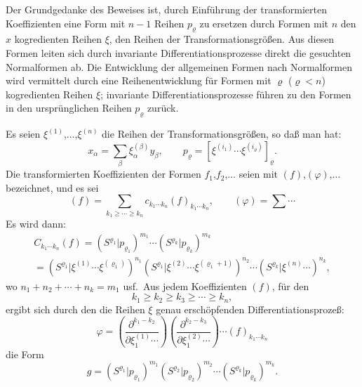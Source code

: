 \documentclass[12pt,a4paper]{article}
\begin{document}
Der Grundgedanke des Beweises ist, durch Einführung der transformierten Koeffizienten eine Form mit $n-1$ Reihen $p_{\varrho}$ zu ersetzen durch Formen mit $n$ den $x$ kogredienten Reihen $\xi$, den Reihen der Transformationsgrößen. Aus diesen Formen leiten sich durch invariante Differentiationsprozesse direkt die gesuchten Normalformen ab. Die Entwicklung der allgemeinen Formen nach Normalformen wird vermittelt durch eine Reihenentwicklung für Formen mit $\varrho$ ($\varrho < n$) kogredienten Reihen $\xi$; invariante Differentiationsprozesse führen zu den Formen in den ursprünglichen Reihen $p_{\varrho}$ zurück.

Es seien $\xi^{(1)}$,$\ldots$,$\xi^{(n)}$ die Reihen der Transformationsgrößen, so daß man hat:
\begin{equation}\tag{47}
x_{\alpha} = \sum_{\beta} \xi^{(\beta)}_{\alpha} y_{\beta}, \qquad p_{\varrho} = [\xi^{(i_{1})} \cdots \xi^{(i_{\varrho})}]_{\varrho}.
\end{equation}
Die transformierten Koeffizienten der Formen $f_{1}$,$f_{2}$,$\ldots$ seien mit $(f)$,$(\varphi)$,$\ldots$ bezeichnet, und es sei
\begin{equation}\tag{48}
(f) = \sum_{k_{1} \geq \cdots \geq k_{n}} c_{k_{1} \cdots k_{n}} (f)_{k_{1} \cdots k_{n}}, \qquad (\varphi) = \sum \cdots
\end{equation}
Es wird dann:
\begin{multline*}\tag{49}
C_{k_{1} \cdots k_{n}}(f) = (S^{\varrho_{1}} | p_{\varrho_{1}})^{m_{1}} \cdots (S^{\varrho_{k}} | p_{\varrho_{k}})^{m_{k}} \\
= (S^{\varrho_{1}} | \xi^{(1)} \cdots \xi^{(\varrho_{1})})^{n_{1}} (S^{\varrho_{1}} | \xi^{(2)} \cdots \xi^{(\varrho_{1}+1)})^{n_{2}} \cdots (S^{\varrho_{k}} | \xi^{(n)} \cdots)^{n_{k}},
\end{multline*}
wo $n_{1} + n_{2} + \cdots + n_{k} = m_{1}$ usf.\ Aus jedem Koeffizienten $(f)$, für den
\begin{equation}\tag{50}
k_{1} \geq k_{2} \geq k_{3} \geq \cdots \geq k_{n},
\end{equation}
ergibt sich durch den die Reihen $\xi$ genau erschöpfenden Differentiationsprozeß:
\begin{equation}\tag{51}
\varphi = \left( \frac{\partial^{k_{1}-k_{2}}}{\partial \xi^{(1)}_{1} \cdots} \right) \left( \frac{\partial^{k_{2}-k_{3}}}{\partial \xi^{(2)}_{1} \cdots} \right) \cdots (f)_{k_{1} \cdots k_{n}}
\end{equation}
die Form
\begin{equation}\tag{52}
g = (S^{\varrho_{1}} | p_{\varrho_{1}})^{m_{1}} (S^{\varrho_{2}} | p_{\varrho_{2}})^{m_{2}} \cdots (S^{\varrho_{k}} | p_{\varrho_{k}})^{m_{k}}.
\end{equation}
\end{document}
